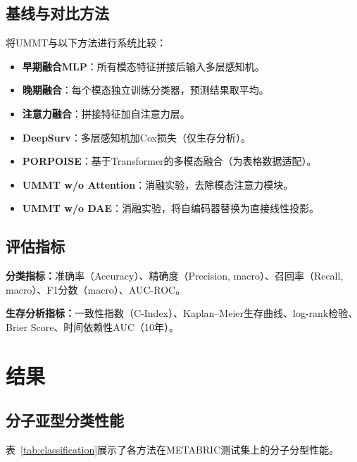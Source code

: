\documentclass[conference]{IEEEtran}
\begin{document}
\subsection{基线与对比方法}

将UMMT与以下方法进行系统比较：
\begin{itemize}
    \item \textbf{早期融合MLP}：所有模态特征拼接后输入多层感知机。
    \item \textbf{晚期融合}：每个模态独立训练分类器，预测结果取平均。
    \item \textbf{注意力融合}：拼接特征加自注意力层。
    \item \textbf{DeepSurv}\cite{katzman2018deepsurv}：多层感知机加Cox损失（仅生存分析）。
    \item \textbf{PORPOISE}\cite{chen2022pan}：基于Transformer的多模态融合（为表格数据适配）。
    \item \textbf{UMMT w/o Attention}：消融实验，去除模态注意力模块。
    \item \textbf{UMMT w/o DAE}：消融实验，将自编码器替换为直接线性投影。
\end{itemize}

\subsection{评估指标}

\textbf{分类指标：}准确率（Accuracy）、精确度（Precision, macro）、召回率（Recall, macro）、F1分数（macro）、AUC-ROC。

\textbf{生存分析指标：}一致性指数（C-Index）、Kaplan--Meier生存曲线、log-rank检验、Brier Score、时间依赖性AUC（10年）。

\section{结果}
\label{sec:results}

\subsection{分子亚型分类性能}

表~\ref{tab:classification}展示了各方法在METABRIC测试集上的分子分型性能。
\end{document}
